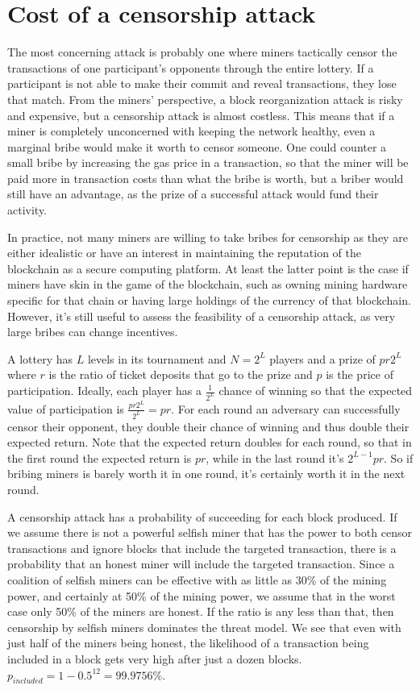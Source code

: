 \section{Cost of a censorship attack}
\label{sec:censorship}

The most concerning attack is probably one where miners tactically censor the transactions of one participant's opponents through the entire lottery. If a participant is not able to make their commit and reveal transactions, they lose that match. From the miners' perspective, a block reorganization attack is risky and expensive, but a censorship attack is almost costless. This means that if a miner is completely unconcerned with keeping the network healthy, even a marginal bribe would make it worth to censor someone. One could counter a small bribe by increasing the gas price in a transaction, so that the miner will be paid more in transaction costs than what the bribe is worth, but a briber would still have an advantage, as the prize of a successful attack would fund their activity. 

In practice, not many miners are willing to take bribes for censorship as they are either idealistic or have an interest in maintaining the reputation of the blockchain as a secure computing platform. At least the latter point is the case if miners have skin in the game of the blockchain, such as owning mining hardware specific for that chain or having large holdings of the currency of that blockchain. However, it's still useful to assess the feasibility of a censorship attack, as very large bribes can change incentives.

A lottery has $L$ levels in its tournament and $N=2^L$ players and a prize of $pr2^L$ where $r$ is the ratio of ticket deposits that go to the prize and $p$ is the price of participation. Ideally, each player has a $\frac{1}{2^L}$ chance of winning so that the expected value of participation is $\frac{pr2^L}{2^L}=pr$. For each round an adversary can successfully censor their opponent, they double their chance of winning and thus double their expected return. Note that the expected return doubles for each round, so that in the first round the expected return is $pr$, while in the last round it's $2^{L-1}pr$. So if bribing miners is barely worth it in one round, it's certainly worth it in the next round.

A censorship attack has a probability of succeeding for each block produced. If we assume there is not a powerful selfish miner that has the power to both censor transactions and ignore blocks that include the targeted transaction, there is a probability that an honest miner will include the targeted transaction. Since a coalition of selfish miners can be effective with as little as 30\% of the mining power, and certainly at 50\% of the mining power, we assume that in the worst case only 50\% of the miners are honest. If the ratio is any less than that, then censorship by selfish miners dominates the threat model. We see that even with just half of the miners being honest, the likelihood of a transaction being included in a block gets very high after just a dozen blocks. $p_{included} = 1-0.5^{12}=99.9756\%$.


